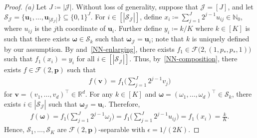 \documentclass[12pt]{article}
\begin{document}
\begin{proof}
    \emph{(a)} Let $J \coloneqq |\mathcal{J}|$. Without loss of generality, suppose that $\mathcal{J} = [J]$, and let $\mathcal{S}_{\mathcal{J}} = \{\bm u_1,\ldots,\bm u_{|\mathcal{S}_{\mathcal{J}}|}\}\subseteq \{0,1\}^{J}$. For $i\in[|\mathcal{S}_{\mathcal{J}}|]$, define $x_i \coloneqq \sum_{j=1}^{J} 2^{j-1} u_{ij} \in \mathbb{N}_0$, where $u_{ij}$ is the $j$th coordinate of $\bm u_i$. Further define $y_i \coloneqq k/K$ where $k\in[K]$ is such that there exists $\bm\omega \in \mathcal{S}_{k}$ such that $\bm\omega_{\mathcal{J}} = \bm u_i$; note that $k$ is uniquely defined by our assumption. By \citet[Lemma~2.2]{shen2019nonlinear} and~\ref{NN-enlarging}, there exists $f_1 \in \mathcal{F}\bigl(2,(1,p_*,p_*,1)\bigr)$ such that $f_1(x_i) = y_i$ for all $i\in[|\mathcal{S}_{\mathcal{J}}|]$. %
    Thus, by~\ref{NN-composition}, there exists $f \in\mathcal{F}(2,\bm p)$ such that
    \begin{align*}
        f(\bm v) = f_1\biggl(\sum_{j=1}^J 2^{j-1} v_j\biggr) 
    \end{align*}
    for $\bm v = (v_1,\ldots,v_d)^\top \in \mathbb{R}^d$.  For any $k\in[K]$ and $\bm\omega = (\omega_1,\ldots,\omega_d)^\top \in \mathcal{S}_k$, there exists $i \in |\mathcal{S}_{\mathcal{J}}|$ such that $\bm\omega_{\mathcal{J}} = \bm u_i$. Therefore,
    \begin{align*}
        f(\bm\omega) = f_1\biggl(\sum_{j=1}^J 2^{j-1} \omega_j\biggr) = f_1\biggl(\sum_{j=1}^J 2^{j-1} u_{ij}\biggr) = f_1(x_i) = \frac{k}{K}.
    \end{align*}
    Hence, $\mathcal{S}_1,\ldots,\mathcal{S}_K$ are $\mathcal{F}(2,\bm p)$-separable with $\epsilon = 1/(2K)$.


\end{proof}
\end{document}
